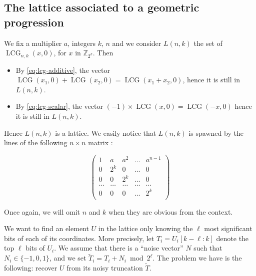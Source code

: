 \documentclass[submission,svgnames,journal=tosc]{iacrtrans}
\DeclareMathOperator{\LCG}{LCG}
\begin{document}
\subsection{The lattice associated to a geometric progression}\label{lattice}

We fix a multiplier \(a\), integers \(k\), \(n\) and we consider \(L(n,k)\) the set of \(\LCG_{n,k}(x, 0)\), for \(x\) in \(\mathbb{Z}_{2^k}\). Then

\begin{itemize}
	\item By \eqref{eq:lcg-additive}, the vector \(\LCG(x_1,0) + \LCG(x_2,0) = \LCG(x_1+x_2,0)\), hence it is still in \(L(n,k)\).
	\item By \eqref{eq:lcg-scalar}, the vector \((-1)\times \LCG(x,0) = \LCG(-x,0)\) hence it is still in \(L(n,k)\).
\end{itemize}

Hence \(L(n,k)\) is a lattice. We easily notice that \(L(n,k)\) is spawned by the lines of the following \(n\times n\) matrix :

\[
  \begin{pmatrix}
    1 & a   & a^2 & \dots & a^{n-1} \\
    0 & 2^k & 0   & \dots & 0 \\
    0 & 0   & 2^k & \dots & 0 \\
    \dots & \dots & \dots & \dots & \dots\\
    0 & 0 & 0 & \dots & 2^k \\
  \end{pmatrix}
\]

Once again, we will omit $n$ and $k$ when they are obvious from the context.

We want to find an element \(U\) in the lattice only knowing the $\ell$ most significant bits of each of its coordinates.  More precisely, let $T_i = U_i[k-\ell:k]$ denote the top $\ell$ bits of $U_i$. We assume that there is a ``noise vector'' $N$ such that $N_i \in \{-1, 0, 1\}$, and we set $\widetilde{T}_i = T_i + N_i \bmod 2^{\ell}$. The problem we have is the  following: recover $U$ from its noisy truncation $\widetilde{T}$.
\end{document}
